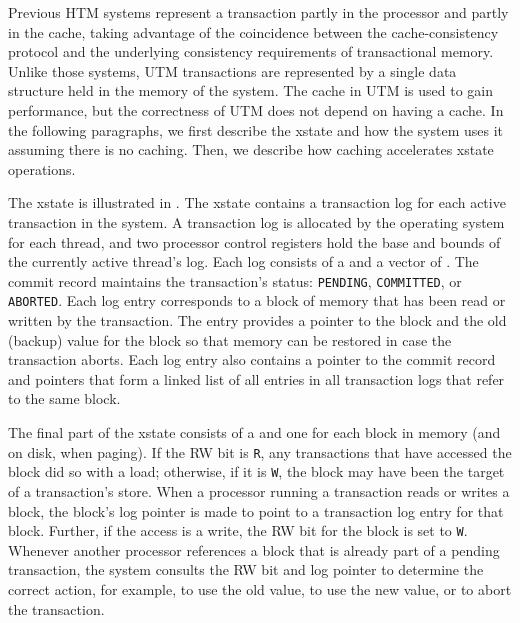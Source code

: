 

Previous HTM systems \cite{Knight86,HerlihyMo93} represent a
transaction partly in the processor and partly in the cache, taking
advantage of the coincidence between the cache-consistency protocol
and the underlying consistency requirements of transactional memory.
Unlike those systems, UTM transactions are represented by a single
 data structure held in the memory of the system.  The
cache in UTM is used to gain performance, but the correctness of
UTM does not depend on having a cache.  In the following
paragraphs, we first describe the xstate and how the system uses it
assuming there is no caching.  Then, we describe how caching
accelerates xstate operations.


The xstate is illustrated in .  The xstate
contains a transaction log for each active transaction in the system.
A transaction log is allocated by the operating system for each
thread, and two processor control registers hold the base and bounds
of the currently active thread's log.  Each log consists of a
 and a vector of .  The commit
record maintains the transaction's status: \texttt{PENDING},
\texttt{COMMITTED}, or \texttt{ABORTED}.  Each log entry corresponds
to a block of memory that has been read or written by the transaction.
The entry provides a pointer to the block and the old (backup) value
for the block so that memory can be restored in case the transaction
aborts.  Each log entry also contains a pointer to the commit record
and pointers that form a linked list of all entries in all transaction
logs that refer to the same block.

The final part of the xstate consists of a  and one
 for each block in memory (and on disk, when paging).  If
the RW bit is \texttt{R}, any transactions that have accessed the
block did so with a load; otherwise, if it is \texttt{W}, the block
may have been the target of a transaction's store.  When a processor
running a transaction reads or writes a block, the block's log pointer
is made to point to a transaction log entry for that block.  Further,
if the access is a write, the RW bit for the block is set to
\texttt{W}.  Whenever another processor references a block that is
already part of a pending transaction, the system consults the RW bit
and log pointer to determine the correct action, for example, to use
the old value, to use the new value, or to abort the transaction.

